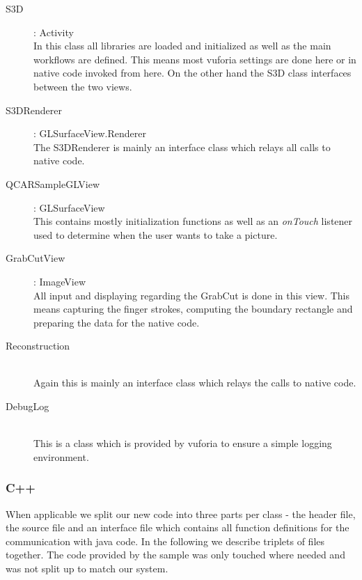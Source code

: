 \documentclass[10pt,twocolumn,letterpaper]{article}
\begin{document}
\begin{description}
	\item[S3D] : Activity \\
		In this class all libraries are loaded and initialized as well as the main workflows are defined. This means most vuforia settings are done here or in native code invoked from here. On the other hand the S3D class interfaces between the two views.
	\item[S3DRenderer] : GLSurfaceView.Renderer\\
		The S3DRenderer is mainly an interface class which relays all calls to native code.
	\item[QCARSampleGLView] : GLSurfaceView\\
		This contains mostly initialization functions as well as an \emph{onTouch} listener used to determine when the user wants to take a picture.
	\item[GrabCutView] : ImageView\\
		All input and displaying regarding the GrabCut is done in this view. This means capturing the finger strokes, computing the boundary rectangle and preparing the data for the native code.
	\item[Reconstruction] \quad \\
		Again this is mainly an interface class which relays the calls to native code.
	\item[DebugLog] \quad \\
		This is a class which is provided by vuforia to ensure a simple logging environment.
\end{description}

\subsubsection{C++}
When applicable we split our new code into three parts per class - the header file, the source file and an interface file which contains all function definitions for the communication with java code. In the following we describe triplets of files together. The code provided by the sample was only touched where needed and was not split up to match our system.
\end{document}

